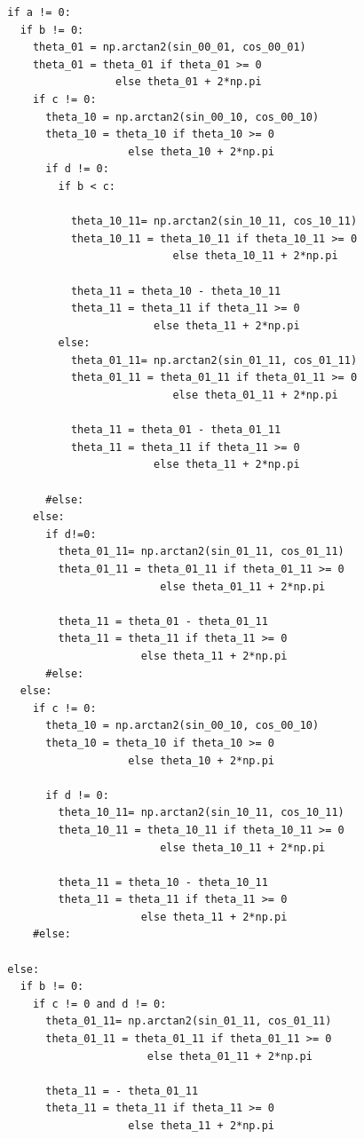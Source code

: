 \documentclass[a4paper, 11pt]{article}
\begin{document}
\begin{verbatim}
  if a != 0:
    if b != 0:
      theta_01 = np.arctan2(sin_00_01, cos_00_01)
      theta_01 = theta_01 if theta_01 >= 0 
                   else theta_01 + 2*np.pi
      if c != 0:
        theta_10 = np.arctan2(sin_00_10, cos_00_10)
        theta_10 = theta_10 if theta_10 >= 0 
                     else theta_10 + 2*np.pi
        if d != 0:
          if b < c:
        
            theta_10_11= np.arctan2(sin_10_11, cos_10_11)
            theta_10_11 = theta_10_11 if theta_10_11 >= 0 
                            else theta_10_11 + 2*np.pi
            
            theta_11 = theta_10 - theta_10_11
            theta_11 = theta_11 if theta_11 >= 0 
                         else theta_11 + 2*np.pi
          else:
            theta_01_11= np.arctan2(sin_01_11, cos_01_11)
            theta_01_11 = theta_01_11 if theta_01_11 >= 0 
                            else theta_01_11 + 2*np.pi
            
            theta_11 = theta_01 - theta_01_11
            theta_11 = theta_11 if theta_11 >= 0 
                         else theta_11 + 2*np.pi
    
        #else:
      else:
        if d!=0:
          theta_01_11= np.arctan2(sin_01_11, cos_01_11)
          theta_01_11 = theta_01_11 if theta_01_11 >= 0 
                          else theta_01_11 + 2*np.pi
          
          theta_11 = theta_01 - theta_01_11
          theta_11 = theta_11 if theta_11 >= 0 
                       else theta_11 + 2*np.pi
        #else:
    else:
      if c != 0:
        theta_10 = np.arctan2(sin_00_10, cos_00_10)
        theta_10 = theta_10 if theta_10 >= 0 
                     else theta_10 + 2*np.pi
    
        if d != 0:
          theta_10_11= np.arctan2(sin_10_11, cos_10_11)
          theta_10_11 = theta_10_11 if theta_10_11 >= 0 
                          else theta_10_11 + 2*np.pi
          
          theta_11 = theta_10 - theta_10_11
          theta_11 = theta_11 if theta_11 >= 0 
                       else theta_11 + 2*np.pi
      #else:
          
  else:
    if b != 0:
      if c != 0 and d != 0:
        theta_01_11= np.arctan2(sin_01_11, cos_01_11)
        theta_01_11 = theta_01_11 if theta_01_11 >= 0 
                        else theta_01_11 + 2*np.pi
        
        theta_11 = - theta_01_11
        theta_11 = theta_11 if theta_11 >= 0 
                     else theta_11 + 2*np.pi
    

\end{verbatim}
\end{document}
